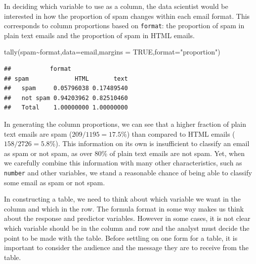 \documentclass[
]{book}
\newenvironment{Shaded}{\begin{snugshade}}{\end{snugshade}}
\newcommand{\AttributeTok}[1]{\textcolor[rgb]{0.77,0.63,0.00}{#1}}
\newcommand{\ConstantTok}[1]{\textcolor[rgb]{0.00,0.00,0.00}{#1}}
\newcommand{\DecValTok}[1]{\textcolor[rgb]{0.00,0.00,0.81}{#1}}
\newcommand{\FunctionTok}[1]{\textcolor[rgb]{0.00,0.00,0.00}{#1}}
\newcommand{\NormalTok}[1]{#1}
\newcommand{\OtherTok}[1]{\textcolor[rgb]{0.56,0.35,0.01}{#1}}
\newcommand{\SpecialCharTok}[1]{\textcolor[rgb]{0.00,0.00,0.00}{#1}}
\newcommand{\StringTok}[1]{\textcolor[rgb]{0.31,0.60,0.02}{#1}}
\begin{document}
In deciding which variable to use as a column, the data scientist would be interested in how the proportion of spam changes within each email format. This corresponds to column proportions based on \texttt{format}: the proportion of spam in plain text emails and the proportion of spam in HTML emails.

\begin{Shaded}
\end{Shaded}

\begin{Shaded}
\begin{Highlighting}[]
\FunctionTok{tally}\NormalTok{(spam}\SpecialCharTok{\textasciitilde{}}\NormalTok{format,}\AttributeTok{data=}\NormalTok{email,}\AttributeTok{margins =} \ConstantTok{TRUE}\NormalTok{,}\AttributeTok{format=}\StringTok{"proportion"}\NormalTok{)}
\end{Highlighting}
\end{Shaded}

\begin{verbatim}
##           format
## spam             HTML       text
##   spam     0.05796038 0.17489540
##   not spam 0.94203962 0.82510460
##   Total    1.00000000 1.00000000
\end{verbatim}

In generating the column proportions, we can see that a higher fraction of plain text emails are spam (\(209/1195 = 17.5\%\)) than compared to HTML emails (\(158/2726 = 5.8\%\)). This information on its own is insufficient to classify an email as spam or not spam, as over 80\% of plain text emails are not spam. Yet, when we carefully combine this information with many other characteristics, such as \texttt{number} and other variables, we stand a reasonable chance of being able to classify some email as spam or not spam.

In constructing a table, we need to think about which variable we want in the column and which in the row. The formula format in some way makes us think about the response and predictor variables. However in some cases, it is not clear which variable should be in the column and row and the analyst must decide the point to be made with the table. Before settling on one form for a table, it is important to consider the audience and the message they are to receive from the table.
\end{document}
